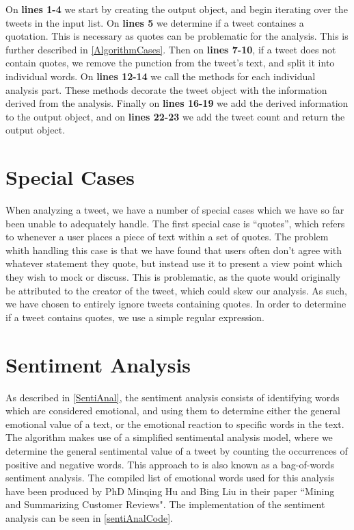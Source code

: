 On \textbf{lines 1-4} we start by creating the output object, and begin
iterating over the tweets in the input list. On \textbf{lines 5} we
determine if a tweet containes a quotation. This is necessary as quotes can be
problematic for the analysis. This is further described in
\autoref{AlgorithmCases}. Then on \textbf{lines 7-10}, if a tweet does not
contain quotes, we remove the punction from the tweet's text, and split it into
individual words. On \textbf{lines 12-14} we call the methods for each
individual analysis part. These methods decorate the tweet object with the
information derived from the analysis. Finally on \textbf{lines 16-19} we add
the derived information to the output object, and on \textbf{lines 22-23} we add
the tweet count and return the output object.

\section{Special Cases}\label{AlgorithmCases}
When analyzing a tweet, we have a number of special cases which we have so far
been unable to adequately handle. The first special case is ``quotes'', which refers
to whenever a user places a piece of text within a set of quotes. The problem
whith handling this case is that we have found that users often don't agree
with whatever statement they quote, but instead use it to present a view point
which they wish to mock or discuss. This is problematic, as the quote would
originally be attributed to the creator of the tweet, which could skew our
analysis. As such, we have chosen to entirely ignore tweets containing quotes.
In order to determine if a tweet contains quotes, we use a simple regular
expression.

\section{Sentiment Analysis}
As described in \autoref{SentiAnal}, the sentiment analysis consists of
identifying words which are considered emotional, and using them to determine
either the general emotional value of a text, or the emotional reaction to
specific words in the text. The algorithm makes use of a simplified sentimental
analysis model, where we determine the general sentimental value of a tweet by
counting the occurrences of positive and negative words. This approach to is
also known as a bag-of-words sentiment analysis\citep{bagSentiment}. The
compiled list of emotional words used for this analysis have been produced by
PhD Minqing Hu and Bing Liu in their paper ``Mining and Summarizing Customer
Reviews"\citep{Hu:2004:MSC:1014052.1014073}. The implementation of the sentiment
analysis can be seen in \autoref{sentiAnalCode}.\\

